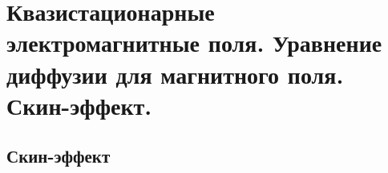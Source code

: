 \section{Квазистационарные электромагнитные поля. Уравнение диффузии для
магнитного поля. Скин-эффект.}

\subsection*{Скин-эффект}

